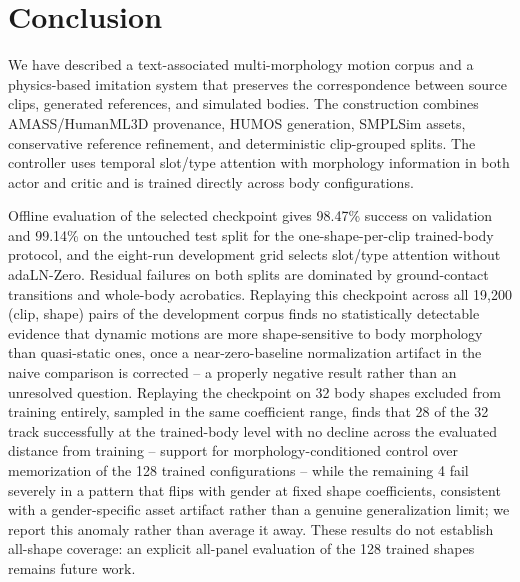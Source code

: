 \section{Conclusion}\label{sec:conclusion}

We have described a text-associated multi-morphology motion corpus and a
physics-based imitation system that preserves the correspondence between
source clips, generated references, and simulated bodies. The construction
combines AMASS/HumanML3D provenance, HUMOS generation, SMPLSim assets,
conservative reference refinement, and deterministic clip-grouped splits.
The controller uses temporal slot/type attention with morphology information
in both actor and critic and is trained directly across body configurations.

Offline evaluation of the selected checkpoint gives 98.47\% success on
validation and 99.14\% on the untouched test split for the one-shape-per-clip
trained-body protocol, and the eight-run development grid selects slot/type
attention without adaLN-Zero. Residual failures on both splits are dominated
by ground-contact transitions and whole-body acrobatics. Replaying this
checkpoint across all 19,200 (clip, shape) pairs of the development corpus
finds no statistically detectable evidence that dynamic motions are more
shape-sensitive to body morphology than quasi-static ones, once a
near-zero-baseline normalization artifact in the naive comparison is
corrected -- a properly negative result rather than an unresolved question.
Replaying the checkpoint on 32 body shapes excluded from training entirely,
sampled in the same coefficient range, finds that 28 of the 32 track
successfully at the trained-body level with no decline across the evaluated
distance from training -- support for morphology-conditioned control over
memorization of the 128 trained configurations -- while the remaining 4 fail
severely in a pattern that flips with gender at fixed shape coefficients,
consistent with a gender-specific asset artifact rather than a genuine
generalization limit; we report this anomaly rather than average it away.
These results do not establish all-shape coverage: an explicit all-panel
evaluation of the 128 trained shapes remains future work.
